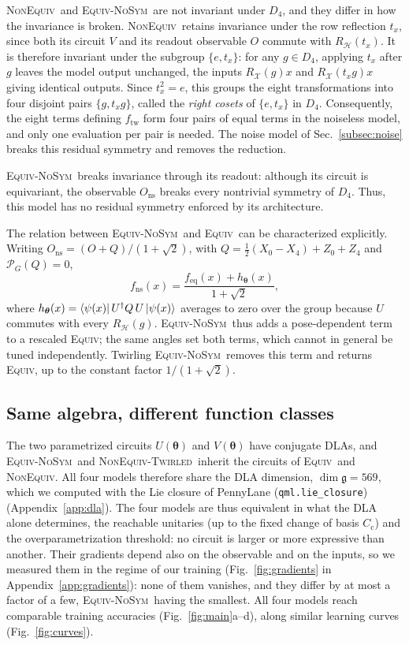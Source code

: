 \documentclass[aps,pra,reprint,superscriptaddress,longbibliography]{revtex4-2}
\newcommand{\Equiv}{\textsc{Equiv}}
\newcommand{\NonEquiv}{\textsc{NonEquiv}}
\newcommand{\Twirled}{\textsc{NonEquiv-Twirled}}
\newcommand{\NoSym}{\textsc{Equiv-NoSym}}
\newcommand{\Ons}{O_{\mathrm{ns}}}
\newcommand{\Hi}{\mathcal{H}}
\newcommand{\RH}{R_{\Hi}}
\begin{document}
\NonEquiv\ and \NoSym\ are not invariant under $D_4$, and they differ in how the invariance is broken. 
\NonEquiv\ retains invariance under the row reflection $t_x$, since
both its circuit $V$ and its readout observable $O$ commute with
$R_{\mathcal H}(t_x)$. It is therefore invariant under the subgroup
$\{e,t_x\}$: for any $g\in D_4$, applying $t_x$ after $g$ leaves the model output
unchanged, the inputs $R_{\mathcal X}(g)x$ and
$R_{\mathcal X}(t_xg)x$ giving identical outputs.
Since $t_x^2=e$, this groups the eight transformations into four
disjoint pairs $\{g,t_xg\}$, called the \emph{right cosets} of
$\{e,t_x\}$ in $D_4$. Consequently, the eight terms defining
$f_{\mathrm{tw}}$ form four pairs of equal terms in the noiseless
model, and only one evaluation per pair is needed.
The noise model of Sec.~\ref{subsec:noise} breaks this residual
symmetry and removes the reduction.

\NoSym\ breaks invariance through its readout: although its circuit
is equivariant, the observable $\Ons$ breaks every nontrivial
symmetry of $D_4$. Thus, this model has no residual symmetry
enforced by its architecture.

The relation between \NoSym\ and \Equiv\ can be characterized explicitly. Writing $\Ons=(O+Q)/(1+\sqrt2)$, with $Q=\tfrac12(X_0-X_4)+Z_0+Z_4$ and $\mathcal P_G(Q)=0$,
\begin{equation}
f_{\mathrm{ns}}(x)=\frac{f_{\mathrm{eq}}(x)+h_{\boldsymbol\theta}(x)}{1+\sqrt2},
\label{eq:nosym_decomposition}
\end{equation}
where $h_{\boldsymbol\theta}(x)=\bra{\psi(x)}U^\dagger Q\,U\ket{\psi(x)}$ averages to zero over the group because $U$ commutes with every $\RH(g)$. \NoSym\ thus adds a pose-dependent term to a rescaled \Equiv; the same angles set both terms, which cannot in general be tuned independently. Twirling \NoSym\ removes this term and returns \Equiv, up to the constant factor $1/(1+\sqrt2)$.

\subsection{Same algebra, different function classes}\label{subsec:dla}

The two parametrized circuits $U(\bm{\theta})$ and $V(\bm{\theta})$ have conjugate DLAs, and \NoSym\ and \Twirled\ inherit the circuits of \Equiv\ and \NonEquiv. All four models therefore share the DLA dimension, $\dim\mathfrak g=569$, which we computed with the Lie closure of PennyLane (\texttt{qml.lie\_closure}) \citep{bergholm2018pennylane} (Appendix~\ref{app:dla}). The four models are thus equivalent in what the DLA alone determines, the reachable unitaries (up to the fixed change of basis $C_{\mathrm c}$) and the overparametrization threshold: no circuit is larger or more expressive than another. Their gradients depend also on the observable and on the inputs, so we measured them in the regime of our training (Fig.~\ref{fig:gradients} in Appendix~\ref{app:gradients}): none of them vanishes, and they differ by at most a factor of a few, \NoSym\ having the smallest. All four models reach comparable training accuracies (Fig.~\ref{fig:main}a--d), along similar learning curves (Fig.~\ref{fig:curves}).
\end{document}
